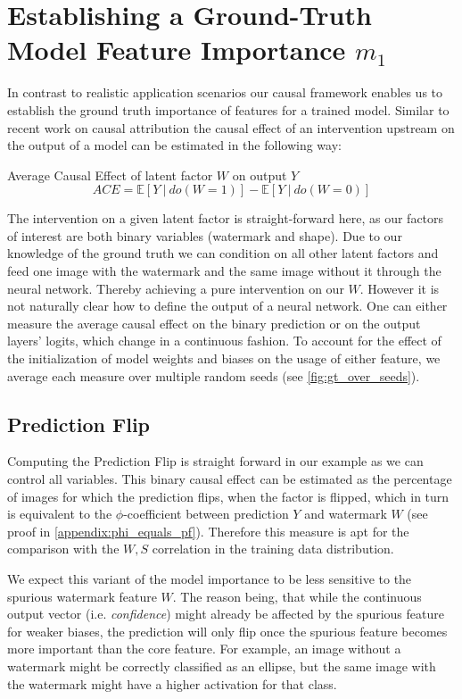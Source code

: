 \section{Establishing a Ground-Truth Model Feature Importance $m_1$}\label{section:gt_measure}
In contrast to realistic application scenarios our causal framework enables us to establish the ground truth importance of features for a trained model. Similar to recent work on causal attribution \cite{Goyal2019,Parafita2019,Karimi2023} the causal effect of an intervention upstream on the output of a model can be estimated in the following way:
\begin{center}
Average Causal Effect of latent factor $W$ on output $Y$ \\
\begin{equation}
\displaystyle ACE = \mathbb{E} [ Y \ | \ do(W=1) ] - \mathbb{E} [ Y \ | \ do(W=0) ] 
\end{equation}
\end{center}
The intervention on a given latent factor is straight-forward here, as our factors of interest are both binary variables (watermark and shape). Due to our knowledge of the ground truth we can condition on all other latent factors and feed one image with the watermark and the same image without it through the neural network. Thereby achieving a pure intervention on our $W$.  
However it is not naturally clear how to define the output of a neural network. One can either measure the average causal effect on the binary prediction or on the output layers' logits, which change in a continuous fashion.
To account for the effect of the initialization of model weights and biases on the usage of either feature, we average each measure over multiple random seeds (see \cref{fig:gt_over_seeds}).

\subsection{Prediction Flip}
Computing the Prediction Flip is straight forward in our example as we can control all variables. 
This binary causal effect can be estimated as the percentage of images for which the prediction flips, when the factor is flipped, which in turn is equivalent to the $\phi$-coefficient between prediction $Y$ and watermark $W$ (see proof in \cref{appendix:phi_equals_pf}). Therefore this measure is apt for the comparison with the $W,S$ correlation in the training data distribution.

We expect this variant of the model importance to be less sensitive to the spurious watermark feature $W$. The reason being, that while the continuous output vector (i.e. \textit{confidence}) might already be affected by the spurious feature for weaker biases, the prediction will only flip once the spurious feature becomes more important than the core feature. For example, an image without a watermark might be correctly classified as an ellipse, but the same image with the watermark might have a higher activation for that class.

